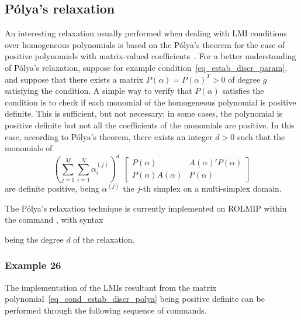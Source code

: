 \documentclass[english,11pt]{article}
\theoremstyle{break} \theorembodyfont{\small\rm}
\begin{document}
\subsection{P\'{o}lya's relaxation}\label{subsec_polya}
An interesting relaxation usually performed when dealing with LMI conditions over homogeneous 
polynomials is based on the P\'{o}lya's theorem for the case of positive polynomials with matrix-valued
coefficients~\cite{Sch:03, Sch:05, OP:08b}. For a better understanding of P\'{o}lya's relaxation,
suppose for example condition~\eqref{eq_estab_discr_param}, and suppose that there exists a matrix
$P(\alpha) = P(\alpha)^T > 0$ of degree $g$ satisfying the condition. A simple way to
verify that $P(\alpha)$ satisfies the condition is to check if each monomial of the homogeneous
polynomial is positive definite. This is sufficient, but not necessary; in some cases,
the polynomial is positive definite but not all the coefficients of the monomials are positive. 
In this case, according to P\'{o}lya's theorem, there exists an integer $d > 0$ such that the monomials of
\begin{equation}\label{eq_cond_estab_discr_polya}
 \left( \sum_{j=1}^M \sum_{i=1}^N \alpha^{(j)}_i \right)^d ~~ \left[ \begin{matrix}
P(\alpha) & A(\alpha)'P(\alpha) \\ P(\alpha)A(\alpha) & P(\alpha)
\end{matrix}  \right]
\end{equation}
are definite positive, being $\alpha^{(j)}$ the $j$-th simplex on a multi-simplex domain.

The P\'{o}lya's relaxation technique is currently implemented on ROLMIP within the command , 
with syntax

\vspace{0.5cm}%
\begin{minipage}{9.5cm}
\end{minipage}
\vspace{0.2cm}

\noindent being  the degree $d$ of the relaxation.

\subsubsection*{Example 26}

The implementation of the LMIs resultant from the matrix polynomial~\eqref{eq_cond_estab_discr_polya} being
positive definite can be performed through the following sequence of commands.
\end{document}
